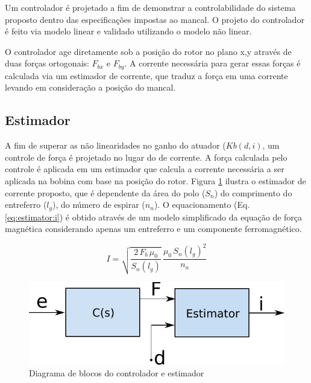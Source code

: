 Um controlador é projetado a fim de demonstrar a controlabilidade do sistema proposto dentro das especificações impostas ao mancal. O projeto do controlador é feito via modelo linear e validado utilizando o modelo não linear. 

O controlador age diretamente sob a posição do rotor no plano x,y através de duas forças ortogonais: $F_{bx}$ e $F_{by}$. A corrente necessária para gerar essas forças é calculada via um estimador de corrente, que traduz a força em uma corrente levando em consideração a posição do mancal.

\subsection{Estimador}
	
A fim de superar as não linearidades no ganho do atuador ($Kb(d,i)$, um controle de força é projetado no lugar do de corrente. A força calculada pelo controle é aplicada em um estimador que calcula a corrente necessária a ser aplicada na bobina com base na posição do rotor. Figura \ref{fig:diagrama_controlador_estimador} ilustra o estimador de corrente proposto, que é dependente da área do polo ($S_n$) do comprimento do entreferro ($l_g$), do número de espirar ($n_n$). O equacionamento (Eq. \eqref{eq:estimator:i}) é obtido através de um modelo simplificado da equação de força magnética considerando apenas um entreferro e um componente ferromagnético.

	
\begin{equation}
I = \sqrt{\frac{2 \, F_b \, \mu_0}{S_n(l_g)}} \, \frac{\mu_0 \, S_n(l_g)^2}{n_n}
\label{eq:estimator:i}
\end{equation}
	
\begin{figure}[ht]
	\centering
	\includegraphics[width=0.4\linewidth]{Figs/Modelagem/controlador_estimador}
	\caption{Diagrama de blocos do controlador e estimador}
	\label{fig:diagrama_controlador_estimador}
\end{figure}

